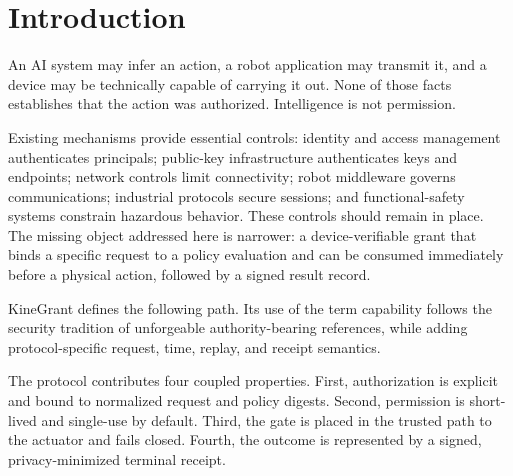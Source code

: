 \documentclass[10.5pt,a4paper]{article}
\begin{document}
\tableofcontents
\newpage

\section{Introduction}

An AI system may infer an action, a robot application may transmit it, and a device may be
technically capable of carrying it out. None of those facts establishes that the action was
authorized. Intelligence is not permission.

Existing mechanisms provide essential controls: identity and access management authenticates
principals; public-key infrastructure authenticates keys and endpoints; network controls limit
connectivity; robot middleware governs communications; industrial protocols secure sessions;
and functional-safety systems constrain hazardous behavior. These controls should remain in
place\cite{ros2,opcua,matter}. The missing object addressed here is narrower: a device-verifiable grant that binds a
specific request to a policy evaluation and can be consumed immediately before a physical
action, followed by a signed result record.

KineGrant defines the following path. Its use of the term capability follows the security
tradition of unforgeable authority-bearing references, while adding protocol-specific request,
time, replay, and receipt semantics\cite{dennis,miller}.

\begin{center}
\end{center}

The protocol contributes four coupled properties. First, authorization is explicit and bound
to normalized request and policy digests. Second, permission is short-lived and single-use by
default. Third, the gate is placed in the trusted path to the actuator and fails closed. Fourth,
the outcome is represented by a signed, privacy-minimized terminal receipt.
\end{document}
